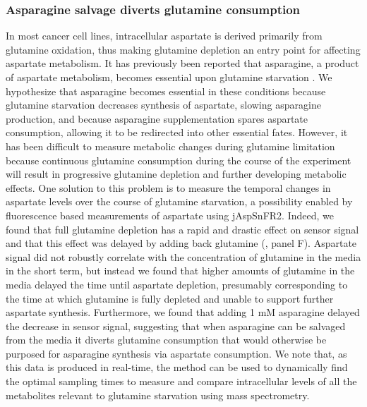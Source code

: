 \documentclass[9pt,lineno]{elife}
\begin{document}
\subsubsection{Asparagine salvage diverts glutamine consumption}
In most cancer cell lines, intracellular aspartate is derived primarily from glutamine oxidation, thus making glutamine depletion an entry point for affecting aspartate metabolism.
It has previously been reported that asparagine, a product of aspartate metabolism, becomes essential upon glutamine starvation \citep{Pavlova2018-nl, Zhang2014-zz}.
We hypothesize that asparagine becomes essential in these conditions because glutamine starvation decreases synthesis of aspartate, slowing asparagine production, and because asparagine supplementation spares aspartate consumption, allowing it to be redirected into other essential fates.
However, it has been difficult to measure metabolic changes during glutamine limitation because continuous glutamine consumption during the course of the experiment will result in progressive glutamine depletion and further developing metabolic effects.
One solution to this problem is to measure the temporal changes in aspartate levels over the course of glutamine starvation, a possibility enabled by fluorescence based measurements of aspartate using jAspSnFR2.
Indeed, we found that full glutamine depletion has a rapid and drastic effect on sensor signal and that this effect was delayed by adding back glutamine (, panel F).
Aspartate signal did not robustly correlate with the concentration of glutamine in the media in the short term, but instead we found that higher amounts of glutamine in the media delayed the time until aspartate depletion, presumably corresponding to the time at which glutamine is fully depleted and unable to support further aspartate synthesis.
Furthermore, we found that adding 1 mM asparagine delayed the decrease in sensor signal, suggesting that when asparagine can be salvaged from the media it diverts glutamine consumption that would otherwise be purposed for asparagine synthesis via aspartate consumption.
We note that, as this data is produced in real-time, the method can be used to dynamically find the optimal sampling times to measure and compare intracellular levels of all the metabolites relevant to glutamine starvation using mass spectrometry.
\end{document}
